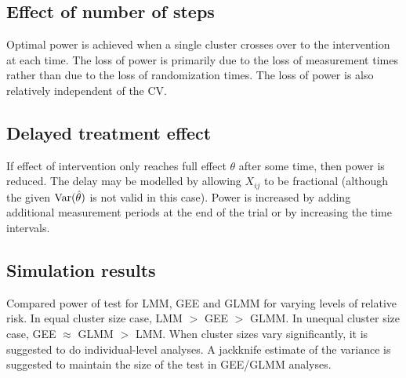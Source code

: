 \documentclass[10pt]{article}
\begin{document}
\subsection{Effect of number of steps}

Optimal power is achieved when a single cluster crosses over to the intervention at each time. The loss of power is primarily due to the loss of measurement times rather than due to the loss of randomization times. The loss of power is also relatively independent of the CV.


\subsection{Delayed treatment effect}

If effect of intervention only reaches full effect $\theta$ after some time, then power is reduced. The delay may be modelled by allowing $X_{ij}$ to be fractional (although the given $\mathrm{Var}(\hat{\theta})$ is not valid in this case). Power is increased by adding additional measurement periods at the end of the trial or by increasing the time intervals.

\subsection{Simulation results}

Compared power of test for LMM, GEE and GLMM for varying levels of relative risk. In equal cluster size case, LMM $>$ GEE $>$ GLMM. In unequal cluster size case, GEE $\approx$ GLMM $>$ LMM. When cluster sizes vary significantly, it is suggested to do individual-level analyses. A jackknife estimate of the variance is suggested to maintain the size of the test in GEE/GLMM analyses.

\fi
\end{document}
